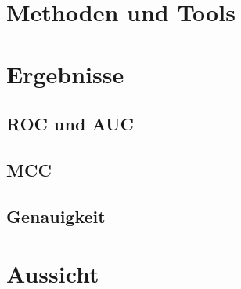 \documentclass[a4paper, doc]{apa6}
\begin{document}
\section{Methoden und Tools}

\section{Ergebnisse}

\subsection{ROC und AUC}

\subsection{MCC}

\subsection{Genauigkeit}

\section{Aussicht}




\end{document}
